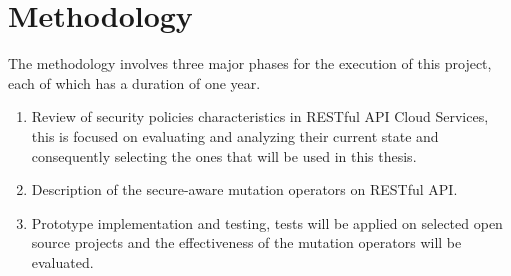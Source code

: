 \chapter{Methodology}

The methodology involves three major phases for the execution of this project, each of which has a duration of one year.

\begin{enumerate}
    \item Review of security policies characteristics in RESTful API Cloud Services, this is focused on evaluating and analyzing their current state and consequently selecting the ones that will be used in this thesis.
    \item Description of the secure-aware mutation operators on RESTful API.
    \item Prototype implementation and testing, tests will be applied on selected open source projects and the effectiveness of the mutation operators will be evaluated.
\end{enumerate}
